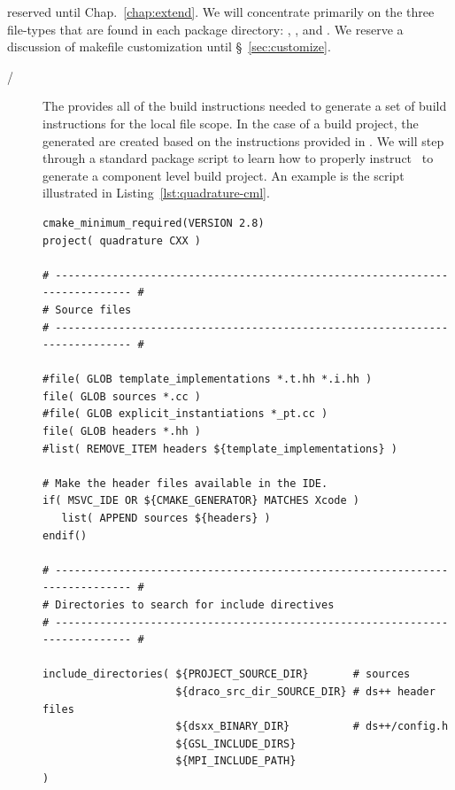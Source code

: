 reserved until Chap.~\ref{chap:extend}.  We will concentrate primarily
on the three file-types that are found in each package directory:
, , and .  We reserve a discussion of makefile
customization until \S~\ref{sec:customize}.
\begin{description}
\item[/] The
   provides all of the build instructions needed to generate a set of build instructions for the local file scope.  In the case of a  build project, the generated  are created based on the instructions provided in .  We will step through a standard package
   script to learn how to properly instruct \cmake\ to generate a component level build project.  An example is the  
   script illustrated in Listing~\ref{lst:quadrature-cml}.
    
\begin{lstlisting}[basicstyle=\footnotesize, xleftmargin=0.0in, xrightmargin=0.0in,caption={\comp{CMakeLists.txt} file for the \pkg{quadrature} package.},label=lst:quadrature-cml,float=htp]
cmake_minimum_required(VERSION 2.8)
project( quadrature CXX )

# ---------------------------------------------------------------------------- #
# Source files
# ---------------------------------------------------------------------------- #

#file( GLOB template_implementations *.t.hh *.i.hh )
file( GLOB sources *.cc )
#file( GLOB explicit_instantiations *_pt.cc )
file( GLOB headers *.hh )
#list( REMOVE_ITEM headers ${template_implementations} )

# Make the header files available in the IDE.
if( MSVC_IDE OR ${CMAKE_GENERATOR} MATCHES Xcode )
   list( APPEND sources ${headers} )
endif()

# ---------------------------------------------------------------------------- #
# Directories to search for include directives
# ---------------------------------------------------------------------------- #

include_directories( ${PROJECT_SOURCE_DIR}       # sources
                     ${draco_src_dir_SOURCE_DIR} # ds++ header files
                     ${dsxx_BINARY_DIR}          # ds++/config.h
                     ${GSL_INCLUDE_DIRS}
                     ${MPI_INCLUDE_PATH}
)


\end{lstlisting}
\end{description}
